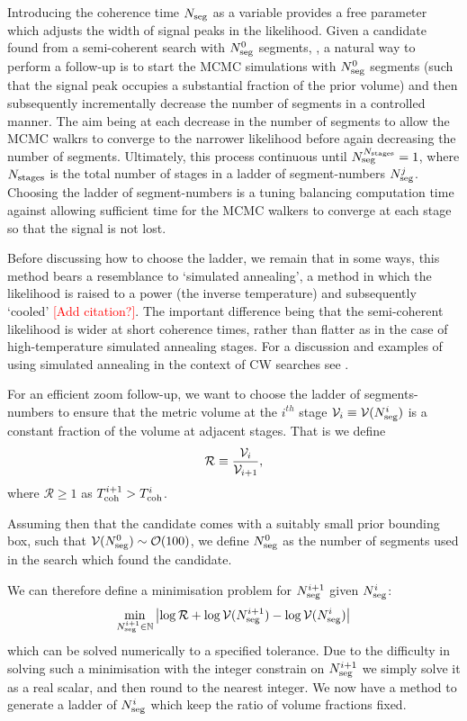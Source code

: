 \documentclass[aps, prd, twocolumn, superscriptaddress, floatfix, showpacs, nofootinbib, longbibliography]{revtex4-1}
\newcommand{\comment}[1]{\textcolor{red}{[#1]}}
\begin{document}
Introducing the coherence time $N_{\rm seg}$ as a variable provides a free parameter
which adjusts the width of signal peaks in the likelihood. Given a candidate
found from a semi-coherent search with $N_{\rm seg}^{0}$ segments, , a natural way to
perform a follow-up is to start the MCMC simulations with $N_{\rm seg}^{0}$ segments
(such that the signal peak occupies a substantial fraction of the prior volume)
and then subsequently incrementally decrease the number of segments in a
controlled manner. The aim being at each decrease in the number of segments to
allow the MCMC walkrs to converge to the narrower likelihood before again
decreasing the number of segments. Ultimately, this process continuous until
$N_{\rm seg}^{N_{\rm stages}}=1$, where $N_{\rm stages}$ is the total number of stages in  a
ladder of segment-numbers $N_{\rm seg}^{j}$. Choosing the ladder of segment-numbers
is a tuning balancing computation time against allowing sufficient
time for the MCMC walkers to converge at each stage so that the signal is not
lost.

Before discussing how to choose the ladder, we remain that in some ways, this
method bears a resemblance to `simulated annealing', a method in which the
likelihood is raised to a power (the inverse temperature) and subsequently
`cooled' \comment{Add citation?}. The important difference being that the
semi-coherent likelihood is wider at short coherence times, rather than flatter
as in the case of high-temperature simulated annealing stages. For a discussion
and examples of using simulated annealing in the context of CW searches see
\citet{veitch2007}.

For an efficient zoom follow-up, we want to choose the ladder of
segments-numbers to ensure that
the metric volume at the $i^{th}$ stage $\mathcal{V}_i \equiv \mathcal{V}(N_{\rm seg}^i)$ is a constant
fraction of the volume at adjacent stages. That is we define
\begin{equation}
\mathcal{R} \equiv \frac{\mathcal{V}_i}{\mathcal{V}_{i+1}},
\end{equation}
where $\mathcal{R} \ge 1$ as $T_{\rm coh}^{i+1} > T_{\rm coh}^{i}$.

Assuming then that the candidate comes with a suitably small prior bounding box,
such that $\mathcal{V}(N_{\rm seg}^{0}) \sim \mathcal{O}(100)$, we define $N_{\rm seg}^0$ as the
number of segments used in the search which found the candidate.

We can therefore define a minimisation problem for $N_{\rm seg}^{i+1}$ given $N_{\rm seg}^{i}$:
\begin{align}
\min_{N_{\rm seg}^{i+1} \in \mathbb{N}}
\left| \log\mathcal{R} + \log\mathcal{V}(N_{\rm seg}^{i+1}) - \log\mathcal{V}(N_{\rm seg}^i)\right|
\end{align}
which can be solved numerically to a specified tolerance. Due to the difficulty
in solving such a minimisation with the integer constrain on $N_{\rm seg}^{i+1}$ we
simply solve it as a real scalar, and then round to the nearest integer. We now
have a method to generate a ladder of $N_{\rm seg}^{i}$ which keep the ratio of
volume fractions fixed.
\end{document}
